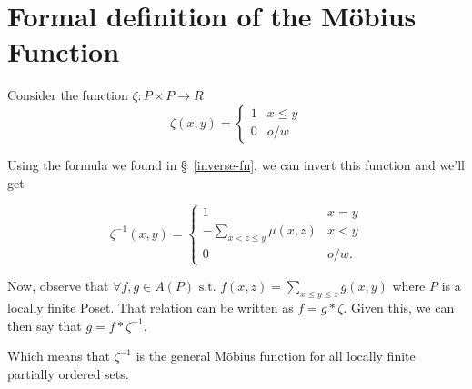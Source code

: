 \section{Formal definition of the M\"obius Function}\label{sec:def}


Consider the function $\zeta: P \times P \to R$
\[
  \zeta(x, y) = \begin{cases}
    1 & x \leq y\\
    0 & o/w
  \end{cases}
\]

Using the formula we found in \S~\ref{inverse-fn}, we can invert this function and we'll get

\[
  \zeta^{-1}(x, y) = \begin{cases}
    1 & x = y\\
    -\sum\limits_{x < z \leq y} \mu(x, z) & x < y\\
    0 & o/w.
  \end{cases} 
\]

Now, observe that $\forall f, g \in A(P) \text{ s.t. } f(x, z) = \sum\limits_{x \leq y \leq z} g(x, y)$
where $P$ is a locally finite Poset. That relation can be written as $f = g * \zeta$. Given this, we can
then say that $g = f * \zeta^{-1}$.

Which means that $\zeta^{-1}$ is the general M\"obius function for all locally finite partially ordered sets.
